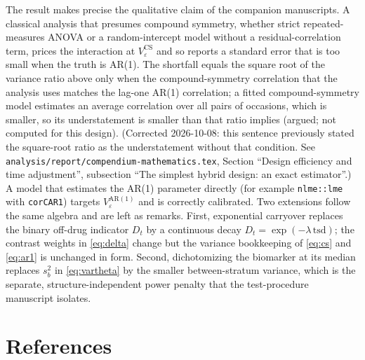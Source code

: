 \documentclass[
  11pt,
]{article}
\begin{document}
The result makes precise the qualitative claim of the companion
manuscripts. A classical analysis that presumes compound symmetry,
whether strict repeated-measures ANOVA or a random-intercept model
without a residual-correlation term, prices the interaction at
\(V_\varepsilon^{\mathrm{CS}}\) and so reports a standard error that is
too small when the truth is AR(1). The shortfall equals the square
root of the variance ratio above only when the compound-symmetry
correlation that the analysis uses matches the lag-one AR(1)
correlation; a fitted compound-symmetry model estimates an average
correlation over all pairs of occasions, which is smaller, so its
understatement is smaller than that ratio implies (argued; not
computed for this design). (Corrected
2026-10-08: this sentence previously stated the square-root ratio as
the understatement without that condition. See
\texttt{analysis/report/compendium-mathematics.tex}, Section ``Design
efficiency and time adjustment'', subsection ``The simplest hybrid
design: an exact estimator''.) A model that estimates the AR(1) parameter directly (for
example \texttt{nlme::lme} with \texttt{corCAR1}) targets
\(V_\varepsilon^{\mathrm{AR}(1)}\) and is correctly calibrated. Two
extensions follow the same algebra and are left as remarks. First,
exponential carryover replaces the binary off-drug indicator \(D_t\) by
a continuous decay \(D_t = \exp(-\lambda\, \text{tsd})\); the contrast
weights in \eqref{eq:delta} change but the variance bookkeeping of
\eqref{eq:cs} and \eqref{eq:ar1} is unchanged in form. Second,
dichotomizing the biomarker at its median replaces \(s_b^2\) in
\eqref{eq:vartheta} by the smaller between-stratum variance, which is
the separate, structure-independent power penalty that the
test-procedure manuscript isolates.

\section{References}\label{references}
\end{document}
